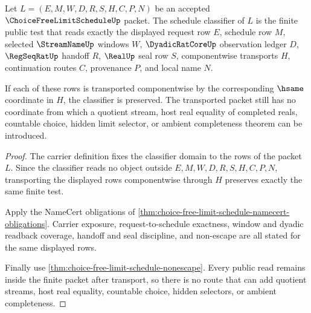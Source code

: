 \begin{theorem}
\label{thm:choice-free-limit-schedule-classifier-transport}
Let $L=(E,M,W,D,R,S,H,C,P,N)$ be an accepted $\ChoiceFreeLimitScheduleUp$ packet. The schedule classifier of $L$ is the finite public test that reads exactly the displayed request row $E$, schedule row $M$, selected $\StreamNameUp$ windows $W$, $\DyadicRatCoreUp$ observation ledger $D$, $\RegSeqRatUp$ handoff $R$, $\RealUp$ seal row $S$, componentwise transports $H$, continuation routes $C$, provenance $P$, and local name $N$.

If each of these rows is transported componentwise by the corresponding $\hsame$ coordinate in $H$, the classifier is preserved. The transported packet still has no coordinate from which a quotient stream, host real equality of completed reals, countable choice, hidden limit selector, or ambient completeness theorem can be introduced.
\end{theorem}
\begin{proof}
The carrier definition fixes the classifier domain to the rows of the packet $L$. Since the classifier reads no object outside $E,M,W,D,R,S,H,C,P,N$, transporting the displayed rows componentwise through $H$ preserves exactly the same finite test.

Apply the NameCert obligations of \autoref{thm:choice-free-limit-schedule-namecert-obligations}. Carrier exposure, request-to-schedule exactness, window and dyadic readback coverage, handoff and seal discipline, and non-escape are all stated for the same displayed rows.

Finally use \autoref{thm:choice-free-limit-schedule-nonescape}. Every public read remains inside the finite packet after transport, so there is no route that can add quotient streams, host real equality, countable choice, hidden selectors, or ambient completeness.
\end{proof}

